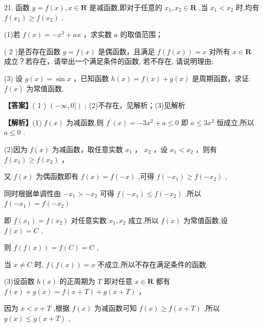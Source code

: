 \documentclass[10pt]{article}
\begin{document}
21. 函数 \(y = f\left( x\right) ,x \in  \mathbf{R}\) 是减函数,即对于任意的 \({x}_{1},{x}_{2} \in  \mathbf{R}\) ,当 \({x}_{1} < {x}_{2}\) 时,均有 \(f\left( {x}_{1}\right)  \geq  f\left( {x}_{2}\right)\) .

(1)若 \(f\left( x\right)  =  - {x}^{3} + {ax}\) ，求实数 \(a\) 的取值范围；

( 2 )是否存在函数 \(y = f\left( x\right)\) 是偶函数，且满足 \(f\left( {f\left( x\right) }\right)  = x\) 对所有 \(x \in  \mathbf{R}\) 成立？若存在，请举出一个满足条件的函数, 若不存在, 请说明理由;

(3) 设 \(g\left( x\right)  = \sin x\) ，已知函数 \(h\left( x\right)  = f\left( x\right)  + g\left( x\right)\) 是周期函数，求证: \(f\left( x\right)\) 为常值函数.

\textbf{【答案】}( 1 ) \(\left( {-\infty ,0\rbrack}\right)\) ; (2)不存在，见解析；(3)见解析

\textbf{【解析】}(1) \(f\left( x\right)\) 为减函数,则 \({f}^{\prime }\left( x\right)  =  - 3{x}^{2} + a \leq  0\) 即 \(a \leq  3{x}^{2}\) 恒成立,所以 \(a \leq  0\) .

(2)因为 \(f\left( x\right)\) 为减函数，取任意实数 \({x}_{1}\) ， \({x}_{2}\) ，设 \({x}_{1} < {x}_{2}\) ，则有 \(f\left( {x}_{1}\right)  \geq  f\left( {x}_{2}\right)\) ，

又 \(f\left( x\right)\) 为偶函数即有 \(f\left( x\right)  = f\left( {-x}\right)\) ,可得 \(f\left( {-{x}_{1}}\right)  \geq  f\left( {-{x}_{2}}\right)\) ,

同时根据单调性由 \(- {x}_{1} >  - {x}_{2}\) 可得 \(f\left( {-{x}_{1}}\right)  \leq  f\left( {-{x}_{2}}\right)\) ,所以 \(f\left( {-{x}_{1}}\right)  = f\left( {-{x}_{2}}\right)\)

即 \(f\left( {x}_{1}\right)  = f\left( {x}_{2}\right)\) 对任意实数 \({x}_{1},{x}_{2}\) 成立,所以 \(f\left( x\right)\) 为常值函数,设 \(f\left( x\right)  = C\) ,

则 \(f\left( {f\left( x\right) }\right)  = f\left( C\right)  = C\) ,

当 \(x \neq  C\) 时, \(f\left( {f\left( x\right) }\right)  = x\) 不成立,所以不存在满足条件的函数.

(3)设函数 \(h\left( x\right)\) 的正周期为 \(T\) 即对任意 \(x \in  \mathbf{R}\) 都有 \(f\left( x\right)  + g\left( x\right)  = f\left( {x + T}\right)  + g\left( {x + T}\right)\) ，

因为 \(x < x + T\) ,根据 \(f\left( x\right)\) 为减函数可知 \(f\left( x\right)  \geq  f\left( {x + T}\right)\) ,所以 \(g\left( x\right)  \leq  g\left( {x + T}\right)\) ,
\end{document}
